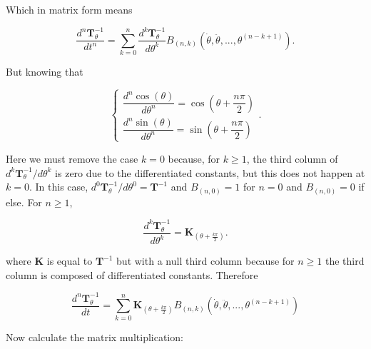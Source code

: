 	Which in matrix form means

\begin{equation} \dfrac{d^n\mathbf{T}^{-1}_\theta}{dt^n} = \sum\limits_{k=0}^n \dfrac{d^k\mathbf{T}^{-1}_\theta}{d\theta^k} B_{\left(n,k\right)}\left(\dot{\theta},\ddot{\theta},...,\theta^{(n-k+1)}\right). \end{equation}

	But knowing that

\begin{equation}
\left\{\begin{array}{l}
\dfrac{d^n \cos\left(\theta\right)}{d\theta^n} = \cos\left(\theta + \dfrac{n\pi}{2}\right) \\[5mm]
\dfrac{d^n \sin\left(\theta\right)}{d\theta^n} = \sin\left(\theta + \dfrac{n\pi}{2}\right)
\end{array}\right. .
\end{equation}

	Here we must remove the case $k=0$ because, for $k\geq 1$, the third column of $d^k\mathbf{T}^{-1}_\theta/d\theta^k$ is zero due to the differentiated constants, but this does not happen at $k = 0$. In this case, $d^0\mathbf{T}^{-1}_\theta/d\theta^0 = \mathbf{T}^{-1}$ and $B_{(n,0)} = 1$ for $n=0$ and $B_{(n,0)} = 0$ if else. For $n\geq 1$,

\begin{equation} \dfrac{d^k \mathbf{T}^{-1}_\theta}{d\theta^k} =  \mathbf{K}_{\left(\theta + \frac{k\pi}{2}\right)}.\end{equation}

	where $\mathbf{K}$ is equal to $\mathbf{T}^{-1}$ but with a null third column because for $n\geq 1$ the third column is composed of differentiated constants. Therefore

\begin{equation} \dfrac{d^n\mathbf{T}^{-1}_\theta}{dt} = \sum\limits_{k=0}^n \mathbf{K}_{\left(\theta + \frac{k\pi}{2}\right)} B_{\left(n,k\right)}\left(\dot{\theta},\ddot{\theta},...,\theta^{(n-k+1)}\right) \end{equation}

	Now calculate the matrix multiplication:

